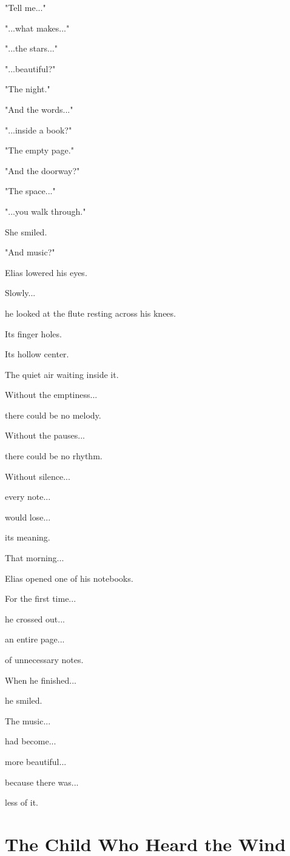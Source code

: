 \documentclass[12pt,openany]{book}
\begin{document}
"Tell me..."

"...what makes..."

"...the stars..."

"...beautiful?"

"The night."

"And the words..."

"...inside a book?"

"The empty page."

"And the doorway?"

"The space..."

"...you walk through."

She smiled.

"And music?"

Elias lowered his eyes.

Slowly...

he looked at the flute resting across his knees.

Its finger holes.

Its hollow center.

The quiet air waiting inside it.

Without the emptiness...

there could be no melody.

Without the pauses...

there could be no rhythm.

Without silence...

every note...

would lose...

its meaning.

That morning...

Elias opened one of his notebooks.

For the first time...

he crossed out...

an entire page...

of unnecessary notes.

When he finished...

he smiled.

The music...

had become...

more beautiful...

because there was...

less of it.
\section*{The Child Who Heard the Wind}
\end{document}
